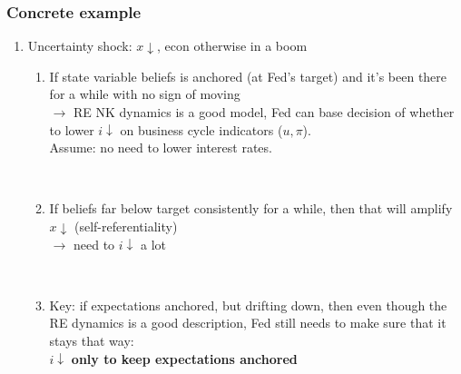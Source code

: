 \documentclass{beamer}
\begin{document}
\begin{frame}
	\frametitle{Concrete example}

\begin{enumerate}
\item[] Uncertainty shock: $x\downarrow$, econ otherwise in a boom
\begin{enumerate}
\item If state variable beliefs is anchored (at Fed's target) and it's been there for a while with no sign of moving \\$\rightarrow$ RE NK dynamics is a good model, Fed can base decision of whether to lower $i\downarrow$ on business cycle indicators ($u, \pi$). \\
Assume: no need to lower interest rates.


\


\item If beliefs far below target consistently for a while, then that will amplify $x\downarrow$ (self-referentiality) \\
$\rightarrow$ need to $i\downarrow$ a lot

\

\item Key: if expectations anchored, but drifting down, then even though the RE dynamics is a good description, Fed still needs to make sure that it stays that way: \\
$i\downarrow$ \textbf{only to keep expectations anchored}

\end{enumerate}
\end{enumerate}

\end{frame}
\end{document}

